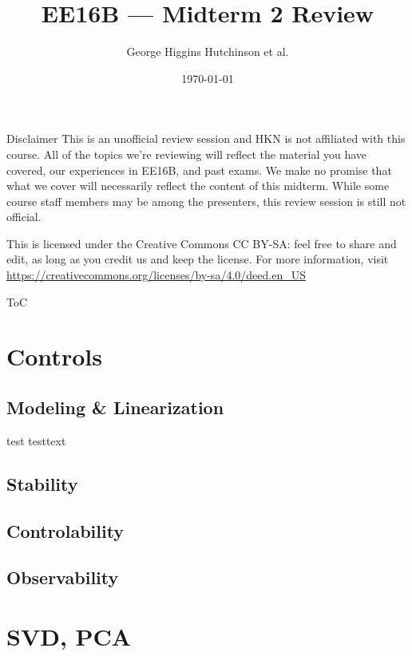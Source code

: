 \documentclass{beamer}
\title{EE16B --- Midterm 2 Review}
\author{George Higgins Hutchinson et al.}
\date{\today}
\begin{document}
	\begin{frame}
		\titlepage
	\end{frame}

	\begin{frame}{Disclaimer}
	This is an unofficial review session and HKN is not affiliated with this course. All of the topics we're reviewing will reflect the material you have covered, our experiences in EE16B, and past exams. We make no promise that what we cover will necessarily reflect the content of this midterm. While some course staff members may be among the presenters, this review session is still not official.
	\vspace{1em}
	
	This is licensed under the Creative Commons CC BY-SA: feel free to share and edit, as long as you credit us and keep the license. For more information, visit \\ \small{\url{https://creativecommons.org/licenses/by-sa/4.0/deed.en_US}}
	
	\end{frame}

	\begin{frame}{ToC}
	\tableofcontents
	\end{frame}

\section{Controls}
\subsection{Modeling \& Linearization}
\begin{frame}{test}
testtext
\end{frame}
\subsection{Stability}
\subsection{Controlability}
\subsection{Observability}

\section{SVD, PCA}
\end{document}
